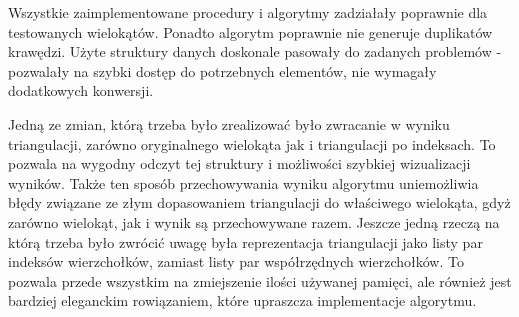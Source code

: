 \quad 
Wszystkie zaimplementowane procedury i algorytmy zadziałały poprawnie dla testowanych wielokątów. 
Ponadto algorytm poprawnie nie generuje duplikatów krawędzi. 
Użyte struktury danych doskonale pasowały do zadanych problemów - pozwalały na szybki dostęp do potrzebnych elementów, nie wymagały dodatkowych konwersji. 


Jedną ze zmian, którą trzeba było zrealizować było zwracanie w wyniku triangulacji, zarówno oryginalnego 
wielokąta jak i triangulacji po indeksach. To pozwala na wygodny odczyt tej struktury i możliwości szybkiej wizualizacji wyników. Także 
ten sposób przechowywania wyniku algorytmu uniemożliwia błędy związane ze złym dopasowaniem triangulacji do właściwego wielokąta, gdyż zarówno wielokąt, jak i wynik są przechowywane razem. 
Jeszcze jedną rzeczą na którą trzeba było zwrócić uwagę była reprezentacja triangulacji jako listy par indeksów wierzchołków, zamiast listy par współrzędnych wierzchołków. 
To pozwala przede wszystkim na zmiejszenie ilości używanej pamięci, ale również jest bardziej eleganckim rowiązaniem, które upraszcza implementacje algorytmu.